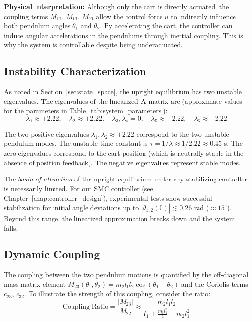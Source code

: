 \textbf{Physical interpretation:} Although only the cart is directly actuated, the coupling terms $M_{12}$, $M_{13}$, $M_{23}$ allow the control force $u$ to indirectly influence both pendulum angles $\theta_1$ and $\theta_2$. By accelerating the cart, the controller can induce angular accelerations in the pendulums through inertial coupling. This is why the system is controllable despite being underactuated.

\subsection{Instability Characterization}

As noted in Section~\ref{sec:state_space}, the upright equilibrium has two unstable eigenvalues. The eigenvalues of the linearized $\mathbf{A}$ matrix are (approximate values for the parameters in Table~\ref{tab:system_parameters}):
\begin{equation}
\lambda_1 \approx +2.22, \quad \lambda_2 \approx +2.22, \quad \lambda_3, \lambda_4 = 0, \quad \lambda_5 \approx -2.22, \quad \lambda_6 \approx -2.22
\label{eq:eigenvalues}
\end{equation}

The two positive eigenvalues $\lambda_1, \lambda_2 \approx +2.22$ correspond to the two unstable pendulum modes. The unstable time constant is $\tau = 1/\lambda \approx 1/2.22 \approx 0.45$ s. The zero eigenvalues correspond to the cart position (which is neutrally stable in the absence of position feedback). The negative eigenvalues represent stable modes.

The \textit{basin of attraction} of the upright equilibrium under any stabilizing controller is necessarily limited. For our SMC controller (see Chapter~\ref{chap:controller_design}), experimental tests show successful stabilization for initial angle deviations up to $|\theta_{1,2}(0)| \lesssim 0.26$ rad ($\approx 15^\circ$). Beyond this range, the linearized approximation breaks down and the system falls.

\subsection{Dynamic Coupling}

The coupling between the two pendulum motions is quantified by the off-diagonal mass matrix element $M_{23}(\theta_1, \theta_2) = m_2 l_1 l_2 \cos(\theta_1 - \theta_2)$ and the Coriolis terms $c_{23}$, $c_{32}$. To illustrate the strength of this coupling, consider the ratio:
\begin{equation}
\text{Coupling Ratio} = \frac{|M_{23}|}{M_{22}} \approx \frac{m_2 l_1 l_2}{I_1 + \frac{m_1 l_1^2}{4} + m_2 l_1^2}
\label{eq:coupling_ratio}
\end{equation}

